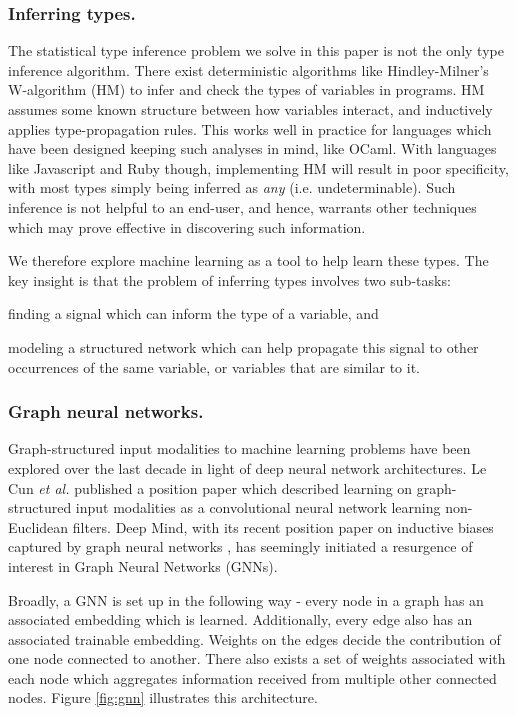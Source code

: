 \subsubsection{Inferring types.}
The statistical type inference problem we solve in this paper is not the only type inference algorithm.
There exist deterministic algorithms like Hindley-Milner's W-algorithm (HM) to infer and check the types of variables in programs.
HM assumes some known structure between how variables interact, and inductively applies type-propagation rules.
This works well in practice for languages which have been designed keeping such analyses in mind, like OCaml.
With languages like Javascript and Ruby though, implementing HM will result in poor specificity, with most types simply being inferred as \textit{any} (i.e. undeterminable).
Such inference is not helpful to an end-user, and hence, warrants other techniques which may prove effective in discovering such information.

We therefore explore machine learning as a tool to help learn these types.
The key insight is that the problem of inferring types involves two sub-tasks:
\begin{enumerate*}[label=(\roman*)]
\item finding a signal which can inform the type of a variable, and
\item modeling a structured network which can help propagate this signal to other occurrences of the same variable, or variables that are similar to it.
\end{enumerate*}

\subsubsection{Graph neural networks.}
Graph-structured input modalities to machine learning problems have been explored over the last decade in light of deep neural network architectures. Le Cun \textit{et al.} published a position paper \cite{henaff2015deep} which described learning on graph-structured input modalities as a convolutional neural network learning non-Euclidean filters. Deep Mind, with its recent position paper on inductive biases captured by graph neural networks \cite{deepmind2018graph}, has seemingly initiated a resurgence of interest in Graph Neural Networks (GNNs).

Broadly, a GNN is set up in the following way - every node in a graph has an associated embedding which is learned. Additionally, every edge also has an associated trainable embedding. Weights on the edges decide the contribution of one node connected to another. There also exists a set of weights associated with each node which aggregates information received from multiple other connected nodes. Figure \ref{fig:gnn} illustrates this architecture.

